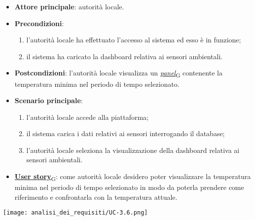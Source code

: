 \begin{itemize}
	\item \textbf{Attore principale}: autorità locale.
	\item \textbf{Precondizioni}:
	      \begin{enumerate}
		      \item l'autorità locale ha effettuato l'accesso al sistema ed esso è in funzione;
		      \item il sistema ha caricato la dashboard relativa ai sensori ambientali.
	      \end{enumerate}
	\item \textbf{Postcondizioni}: l'autorità locale visualizza un \href{https://7last.github.io/docs/pb/documentazione-interna/glossario\#panel}{\textit{panel}\textsubscript{G}} contenente la temperatura minima nel periodo di tempo selezionato.
	\item \textbf{Scenario principale}:
	      \begin{enumerate}
		      \item l'autorità locale accede alla piattaforma;
		      \item il sistema carica i dati relativi ai sensori interrogando il database;
		      \item l'autorità locale seleziona la visualizzazione della dashboard relativa ai sensori ambientali.
	      \end{enumerate}
	\item \href{https://7last.github.io/docs/pb/documentazione-interna/glossario\#user-story}{\textbf{User story}\textsubscript{G}}:
	      come autorità locale desidero poter visualizzare la temperatura minima nel periodo di tempo selezionato
	      in modo da poterla prendere come riferimento e confrontarla con la temperatura attuale.
\end{itemize}
\begin{center}
	\texttt{[image: analisi\_dei\_requisiti/UC-3.6.png]}
\end{center}


